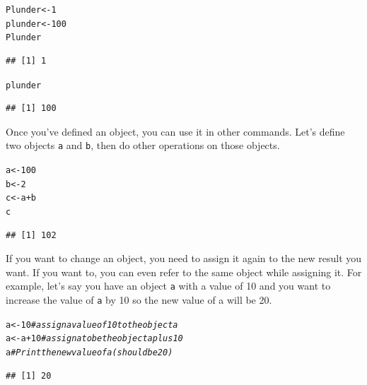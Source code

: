 \documentclass{tufte-book}\usepackage[]{graphicx}\usepackage[]{color}
\makeatletter
\newcommand{\hlnum}[1]{\textcolor[rgb]{0.686,0.059,0.569}{#1}}%
\newcommand{\hlcom}[1]{\textcolor[rgb]{0.678,0.584,0.686}{\textit{#1}}}%
\newcommand{\hlopt}[1]{\textcolor[rgb]{0,0,0}{#1}}%
\newcommand{\hlstd}[1]{\textcolor[rgb]{0.345,0.345,0.345}{#1}}%
\newcommand{\hlkwb}[1]{\textcolor[rgb]{0.69,0.353,0.396}{#1}}%
\newenvironment{kframe}{%
 \def\at@end@of@kframe{}%
 \ifinner\ifhmode%
  \def\at@end@of@kframe{\end{minipage}}%
  \begin{minipage}{\columnwidth}%
 \fi\fi%
 \def\FrameCommand##1{\hskip\@totalleftmargin \hskip-\fboxsep
 \colorbox{shadecolor}{##1}\hskip-\fboxsep
     \hskip-\linewidth \hskip-\@totalleftmargin \hskip\columnwidth}%
 \MakeFramed {\advance\hsize-\width
   \@totalleftmargin\z@ \linewidth\hsize
   \@setminipage}}%
 {\par\unskip\endMakeFramed%
 \at@end@of@kframe}
\newenvironment{knitrout}{}{} %
\makeatother
\begin{document}
\begin{knitrout}
\color{fgcolor}\begin{kframe}
\begin{alltt}
\hlstd{Plunder} \hlkwb{<-} \hlnum{1}
\hlstd{plunder} \hlkwb{<-} \hlnum{100}
\hlstd{Plunder}
\end{alltt}
\begin{verbatim}
## [1] 1
\end{verbatim}
\begin{alltt}
\hlstd{plunder}
\end{alltt}
\begin{verbatim}
## [1] 100
\end{verbatim}
\end{kframe}
\end{knitrout}

Once you've defined an object, you can use it in other commands. Let's define two objects \texttt{a} and \texttt{b}, then do other operations on those objects.

\begin{knitrout}
\color{fgcolor}\begin{kframe}
\begin{alltt}
\hlstd{a} \hlkwb{<-} \hlnum{100}
\hlstd{b} \hlkwb{<-} \hlnum{2}
\hlstd{c} \hlkwb{<-} \hlstd{a} \hlopt{+} \hlstd{b}
\hlstd{c}
\end{alltt}
\begin{verbatim}
## [1] 102
\end{verbatim}
\end{kframe}
\end{knitrout}

If you want to change an object, you need to assign it again to the new result you want. If you want to, you can even refer to the same object while assigning it. For example, let's say you have an object \texttt{a} with a value of 10 and you want to increase the value of \texttt{a} by 10 so the new value of a will be 20.

\begin{knitrout}
\color{fgcolor}\begin{kframe}
\begin{alltt}
\hlstd{a} \hlkwb{<-} \hlnum{10}   \hlcom{# assign a value of 10 to the object a}
\hlstd{a} \hlkwb{<-} \hlstd{a} \hlopt{+} \hlnum{10}  \hlcom{# assign a to be the object a plus 10}
\hlstd{a} \hlcom{# Print the new value of a (should be 20)}
\end{alltt}
\begin{verbatim}
## [1] 20
\end{verbatim}
\end{kframe}
\end{knitrout}
\end{document}
